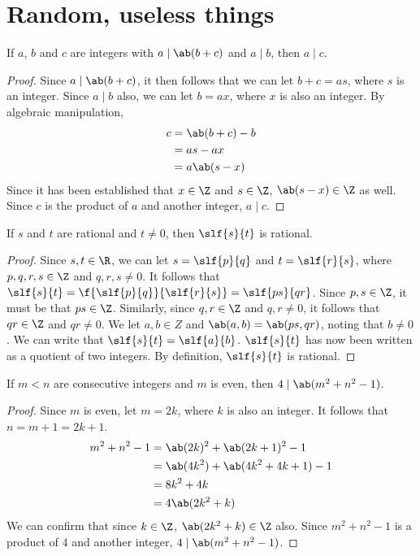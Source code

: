 \chapter*{Random, useless things}
\begin{lemma}
	If \(a\), \(b\) and \(c\) are integers with \(a \mid \ab(b + c)\) and \(a \mid b\),
	then \(a \mid c\).
\end{lemma}
\begin{proof}
	Since \(a \mid \ab(b + c)\), it then follows that we can let \(b + c = as\),
	where \(s\) is an integer.
	Since \(a \mid b\) also, we can let \(b = ax\), where \(x\) is also an integer.
	By algebraic manipulation,
	\begin{align*}
		c & = \ab(b + c) - b \\
		  & = as - ax        \\
		  & = a \ab(s - x)
	\end{align*}
	Since it has been established that \(x \in \Z\) and \(s \in \Z\), \(\ab(s - x) \in \Z\)
	as well. Since \(c\) is the product of \(a\) and another integer, \(a \mid c\).
\end{proof}

\begin{lemma}
	If \(s\) and \(t\) are rational and \(t \neq 0\), then \(\slf{s}{t}\) is rational.
\end{lemma}
\begin{proof}
	Since \(s, t \in \R\), we can let \(s = \slf{p}{q}\) and \(t = \slf{r}{s}\), where
	\(p, q, r, s \in \Z\) and \(q, r, s \neq 0\). It follows that \(\slf{s}{t} = \f{ \slf{p}{q} }{ \slf{r}{s} } = \slf{ps}{qr}\).
	Since \(p, s \in \Z\), it must be that \(ps \in \Z\). Similarly, since \(q, r \in \Z\)
	and \(q, r \neq 0\), it follows that \(qr \in \Z\) and \(qr \neq 0\).
	We let \(a, b \in Z\) and \(\ab(a, b) = \ab(ps, qr)\), noting that \(b \neq 0\).
	We can write that \(\slf{s}{t} = \slf{a}{b}\).
	\(\slf{s}{t}\) has now been written as a quotient of two integers. By definition,
	\(\slf{s}{t}\) is rational.
\end{proof}

\begin{lemma}
	If \(m < n\) are consecutive integers and \(m\) is even, then
	\(4 \mid \ab(m^2 + n^2 - 1)\).
\end{lemma}
\begin{proof}
	Since \(m\) is even, let \(m = 2k\), where \(k\) is also an integer.
	It follows that \(n = m + 1 = 2k + 1\).
	\begin{align*}
		m^2 + n^2 - 1 & = \ab(2k)^2 + \ab(2k + 1)^2 - 1      \\
		              & = \ab(4k^2) + \ab(4k^2 + 4k + 1) - 1 \\
		              & = 8k^2 + 4k                          \\
		              & = 4 \ab(2k^2 + k)
	\end{align*}
	We can confirm that since \(k \in \Z\), \(\ab(2k^2 + k) \in \Z\) also.
	Since \(m^2 + n^2 - 1\) is a product of \(4\) and another integer, \(4 \mid \ab(m^2 + n^2 - 1)\).
\end{proof}

